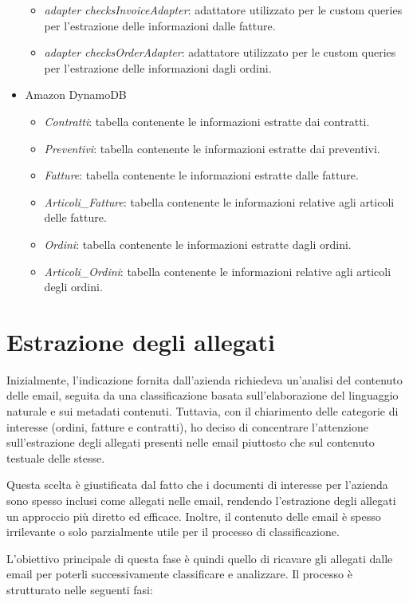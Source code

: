 \begin{itemize}
\begin{itemize}
        \item \emph{adapter checksInvoiceAdapter}: adattatore utilizzato per le custom queries per l'estrazione delle informazioni dalle fatture.
        \item \emph{adapter checksOrderAdapter}: adattatore utilizzato per le custom queries per l'estrazione delle informazioni dagli ordini.
    \end{itemize}
    \item Amazon DynamoDB
    \begin{itemize}
        \item \emph{Contratti}: tabella contenente le informazioni estratte dai contratti.
        \item \emph{Preventivi}: tabella contenente le informazioni estratte dai preventivi.
        \item \emph{Fatture}: tabella contenente le informazioni estratte dalle fatture.
        \item \emph{Articoli\_Fatture}: tabella contenente le informazioni relative agli articoli delle fatture.
        \item \emph{Ordini}: tabella contenente le informazioni estratte dagli ordini.
        \item \emph{Articoli\_Ordini}: tabella contenente le informazioni relative agli articoli degli ordini.
    \end{itemize}
\end{itemize}
\section{Estrazione degli allegati}
\label{sec:estrazione-allegati}
Inizialmente, l'indicazione fornita dall'azienda richiedeva un'analisi del contenuto delle email, seguita da una classificazione basata sull'elaborazione del linguaggio naturale e sui metadati contenuti. Tuttavia, con il chiarimento delle categorie di interesse (ordini, fatture e contratti), ho deciso di concentrare l'attenzione sull'estrazione degli allegati presenti nelle email piuttosto che sul contenuto testuale delle stesse.

Questa scelta è giustificata dal fatto che i documenti di interesse per l'azienda sono spesso inclusi come allegati nelle email, rendendo l'estrazione degli allegati un approccio più diretto ed efficace. Inoltre, il contenuto delle email è spesso irrilevante o solo parzialmente utile per il processo di classificazione.

L'obiettivo principale di questa fase è quindi quello di ricavare gli allegati dalle email per poterli successivamente classificare e analizzare. Il processo è strutturato nelle seguenti fasi:

